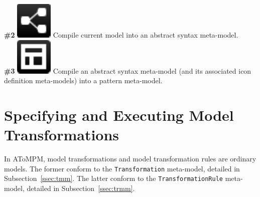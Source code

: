 \documentclass{article}
\numberwithin{equation}{section}
\numberwithin{figure}{section}
\begin{document}
\textbf{\#2} \hspace*{1cm}
\includegraphics[scale=0.5]{figures/icon_compileToASMM} \hspace*{1cm}
Compile current model into an abstract syntax meta-model.\\

\textbf{\#3} \hspace*{1cm}
\includegraphics[scale=0.5]{figures/icon_compileToPatternMM} \hspace*{1cm}
Compile an abstract syntax meta-model (and its associated icon definition meta-\hspace*{3.7cm}models) into a pattern meta-model.





\newpage
\section{Specifying and Executing Model Transformations}
\label{sec:mt}
In AToMPM, model transformations and model transformation rules are ordinary models. The former conform to the \texttt{Transformation} meta-model, detailed in Subsection~\ref{ssec:tmm}. The latter conform to the \texttt{TransformationRule} meta-model, detailed in Subsection~\ref{ssec:trmm}.



\end{document}

